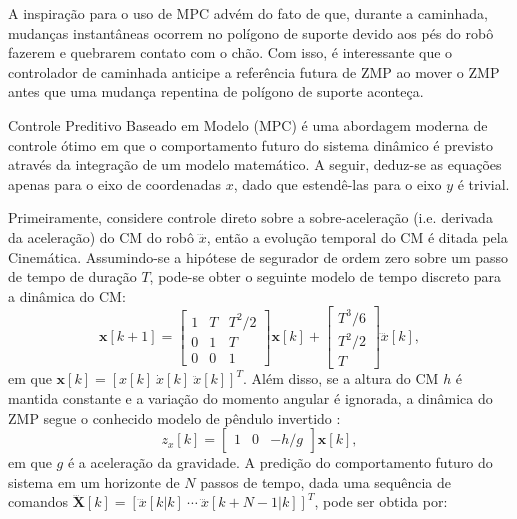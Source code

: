 A inspiração para o uso de MPC advém do fato de que, durante a caminhada, mudanças instantâneas ocorrem no polígono de suporte devido aos pés do robô fazerem e quebrarem contato com o chão. Com isso, é interessante que o controlador de caminhada anticipe a referência futura de ZMP ao mover o ZMP antes que uma mudança repentina de polígono de suporte aconteça.

Controle Preditivo Baseado em Modelo (MPC) é uma abordagem moderna de controle ótimo em que o comportamento futuro do sistema dinâmico é previsto através da integração de um modelo matemático. A seguir, deduz-se as equações apenas para o eixo de coordenadas \( x \), dado que estendê-las para o eixo \( y \) é trivial.

Primeiramente, considere controle direto sobre a sobre-aceleração (i.e. derivada da aceleração) do CM do robô  \( \dddot{x} \), então a evolução temporal do CM é ditada pela Cinemática. Assumindo-se a hipótese de segurador de ordem zero sobre um passo de tempo de duração \( T \), pode-se obter o seguinte modelo de tempo discreto para a dinâmica do CM:
\begin{equation}
\mathrm{\mathbf{x}}[k+1] = \begin{bmatrix}
1 & T & T^2/2 \\ 0 & 1 & T \\ 0 & 0 & 1
\end{bmatrix} \mathrm{\mathbf{x}}[k] + \begin{bmatrix}
T^3/6 \\ T^2/2 \\ T
\end{bmatrix} \dddot{x}[k],
\label{eq:discrete_dynamics_x}
\end{equation}
em que \( \mathrm{\mathbf{x}}[k] = \left[ x[k] \ \dot{x}[k] \ \ddot{x}[k] \right]^T \). Além disso, se a altura do CM \( h \) é mantida constante e a variação do momento angular é ignorada, a dinâmica do ZMP segue o conhecido modelo de pêndulo invertido \cite{kajita2001}:
\begin{equation}
z_x[k] = \begin{bmatrix}
1 & 0 & -h/g
\end{bmatrix} \mathrm{\mathbf{x}}[k],
\label{eq:zmp}
\end{equation}
em que \( g \) é a aceleração da gravidade. A predição do comportamento futuro do sistema em um horizonte de \( N \) passos de tempo, dada uma sequência de comandos \( \dddot{\mathrm{\mathbf{X}}}[k] = \left[\dddot{x}[k|k] \ \cdots \ \dddot{x}[k+N-1|k] \right]^T \), pode ser obtida por:
